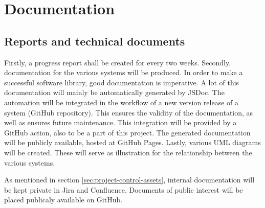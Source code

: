 \chapter{Documentation}
\section{Reports and technical documents}
Firstly, a progress report shall be created for every two weeks. Secondly, documentation for the various systems will be produced. In order to make a successful software library, good documentation is imperative. A lot of this documentation will mainly be automatically generated by JSDoc. The automation will be integrated in the workflow of a new version release of a system (GitHub repository). This ensures the validity of the documentation, as well as ensures future maintenance. This integration will be provided by a GitHub action, also to be a part of this project. The generated documentation will be publicly available, hosted at GitHub Pages. Lastly, various UML diagrams will be created. These will serve as illustration for the relationship between the various systems.

As mentioned in section \ref{sec:project-control-assets}, internal documentation will be kept private in Jira and Confluence. Documents of public interest will be placed publicaly available on GitHub.